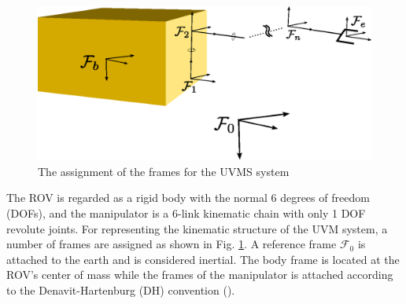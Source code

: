 \begin{figure}[h!]
  \centering
  \includegraphics[scale=0.6]{./figures/uvms_kinematics.eps}
  \caption{The assignment of the frames for the UVMS system}
  \label{fig:uvms_kinematics}
\end{figure}
The ROV is regarded as a rigid body with the normal 6 degrees of freedom (DOFs), and the manipulator is a 6-link kinematic chain with only 1 DOF revolute joints. For representing the kinematic structure of the UVM system, a number of frames are assigned as shown in Fig. \ref{fig:uvms_kinematics}. A reference frame $\mathcal{F}_0$ is attached to the earth and is considered inertial. The body frame is located at the ROV's center of mass while the frames of the manipulator is attached according to the Denavit-Hartenburg (DH) convention (\cite{spong2005robot}). 

